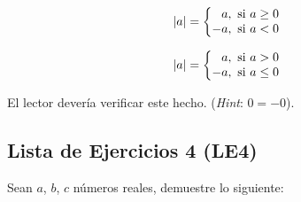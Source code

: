 \documentclass[11pt]{article}
\begin{document}
\begin{center}
\begin{minipage}[c]{.3\linewidth}
 \[|a| = \left\{
  \begin{array}{@{}r@{\thinspace}l}
   a, & \ \text{si} \ a\geq 0\\
   -a, & \ \text{si} \ a<0
  \end{array} \right.\]
 \end{minipage}%
\begin{minipage}[c]{.3\linewidth}
 \[|a| = \left\{
  \begin{array}{@{}r@{\thinspace}l}
   a, & \ \text{si} \ a>0\\
   -a, & \ \text{si} \ a\leq 0
  \end{array} \right.\]
\end{minipage}
\end{center}

El lector devería verificar este hecho. (\textit{Hint}: $0=-0$).

\subsection*{Lista de Ejercicios 4 (LE4)}

Sean $a$, $b$, $c$ números reales, demuestre lo siguiente:
\end{document}
